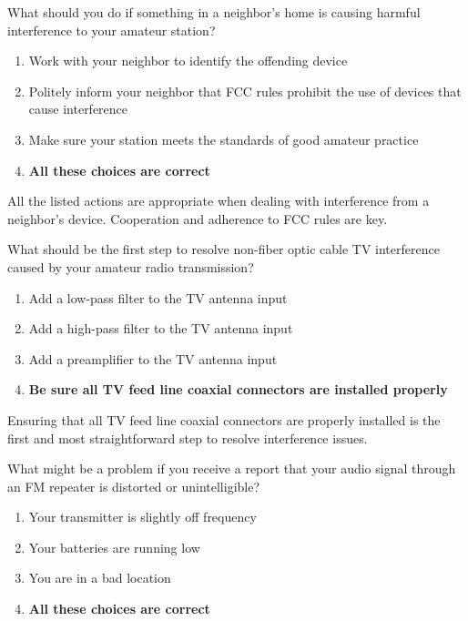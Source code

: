 \begin{tcolorbox}[colback=gray!10!white,colframe=black!75!black,title={T7B08}]
    What should you do if something in a neighbor’s home is causing harmful interference to your amateur station?
    \begin{enumerate}[label=\Alph*),noitemsep]
        \item Work with your neighbor to identify the offending device
        \item Politely inform your neighbor that FCC rules prohibit the use of devices that cause interference
        \item Make sure your station meets the standards of good amateur practice
        \item \textbf{All these choices are correct}
    \end{enumerate}
\end{tcolorbox}

All the listed actions are appropriate when dealing with interference from a neighbor's device. Cooperation and adherence to FCC rules are key.

\begin{tcolorbox}[colback=gray!10!white,colframe=black!75!black,title={T7B09}]
    What should be the first step to resolve non-fiber optic cable TV interference caused by your amateur radio transmission?
    \begin{enumerate}[label=\Alph*),noitemsep]
        \item Add a low-pass filter to the TV antenna input
        \item Add a high-pass filter to the TV antenna input
        \item Add a preamplifier to the TV antenna input
        \item \textbf{Be sure all TV feed line coaxial connectors are installed properly}
    \end{enumerate}
\end{tcolorbox}

Ensuring that all TV feed line coaxial connectors are properly installed is the first and most straightforward step to resolve interference issues.

\begin{tcolorbox}[colback=gray!10!white,colframe=black!75!black,title={T7B10}]
    What might be a problem if you receive a report that your audio signal through an FM repeater is distorted or unintelligible?
    \begin{enumerate}[label=\Alph*),noitemsep]
        \item Your transmitter is slightly off frequency
        \item Your batteries are running low
        \item You are in a bad location
        \item \textbf{All these choices are correct}
    \end{enumerate}
\end{tcolorbox}

